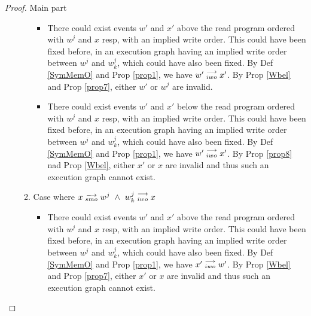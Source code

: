 \begin{proof}{Main part}
\begin{itemize}
\begin{enumerate}
                                \begin{itemize}
                                
                                    \item There could exist events $w'$ and $x'$ above the read program ordered with $w^j$ and $x$ resp, with an implied write order. This could have been fixed before, in an execution graph having an implied write order between $w^j$ and $w_k^j$, which could have also been fixed.
                                    By Def \ref{SymMemO} and Prop \ref{prop1}, we have $w'\stackrel{\longrightarrow}{_{iwo}}x'$.
                                    By Prop \ref{Wbel} and Prop \ref{prop7}, either $w'$ or $w^j$ are invalid. 

                                    \item There could exist events $w'$ and $x'$ below the read program ordered with $w^j$ and $x$ resp, with an implied write order. This could have been fixed before, in an execution graph having an implied write order between $w^j$ and $w_k^j$, which could have also been fixed.
                                    By Def \ref{SymMemO} and Prop \ref{prop1}, we have $w'\stackrel{\longrightarrow}{_{iwo}}x'$.
                                    By Prop \ref{prop8} nad Prop \ref{Wbel}, either $x'$ or $x$ are invalid and thus such an execution graph cannot exist. 
                                    
                                \end{itemize}

                            \item Case where $x\stackrel{\longrightarrow}{_{smo}}w^j \ \wedge \ w_k^j\stackrel{\longrightarrow}{_{iwo}}x$
                                
                                \begin{itemize}
                                
                                    \item There could exist events $w'$ and $x'$ above the read program ordered with $w^j$ and $x$ resp, with an implied write order. This could have been fixed before, in an execution graph having an implied write order between $w^j$ and $w_k^j$, which could have also been fixed.
                                    By Def \ref{SymMemO} and Prop \ref{prop1}, we have $x'\stackrel{\longrightarrow}{_{iwo}}w'$.
                                    By Prop \ref{Wbel} and Prop \ref{prop7}, either $x'$ or $x$ are invalid and thus such an execution graph cannot exist.  


\end{itemize}
\end{enumerate}
\end{itemize}
\end{proof}

